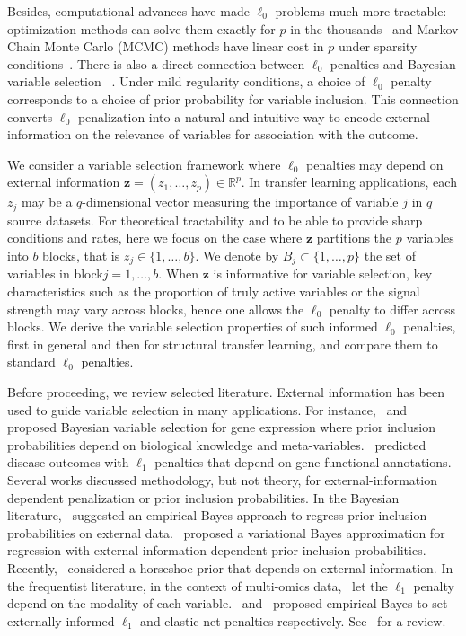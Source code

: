 \documentclass[
  12pt]{article}
\newcommand{\R}{\mathbb{R}}
\newcommand{\bz}{\boldsymbol{z}}
\begin{document}
Besides, computational advances have made $\ell_0$ problems much more tractable: optimization methods can solve them exactly for $p$ in the thousands~\citep{bertsimas2020sparse} and Markov Chain Monte Carlo (MCMC) methods have linear cost in $p$ under sparsity conditions~\citep{Yang2016,zhou2022}. There is also a direct connection between $\ell_0$ penalties and Bayesian variable selection ~\citep{BIC,EBIC,rossell2022concentration}. Under mild regularity conditions, a choice of $\ell_0$ penalty corresponds to a choice of prior probability for variable inclusion. This connection converts $\ell_0$ penalization into a natural and intuitive way to encode external information on the relevance of variables for association with the outcome. 

We consider a variable selection framework where $\ell_0$ penalties may depend on external information $\bz=(z_1,\ldots,z_p) \in \R^p$. In transfer learning applications, each $z_j$ may be a $q$-dimensional vector measuring the importance of variable $j$ in $q$ source datasets. For theoretical tractability and to be able to provide sharp conditions and rates, here we focus on the case where $\bz$ partitions the $p$ variables into $b$ blocks, that is $z_j \in \{1,\ldots,b\}$.
We denote by $B_j \subset \{1,\ldots,p\}$ the set of variables in block$j=1,\ldots,b$.
When $\bz$ is informative for variable selection, key characteristics such as the proportion of truly active variables or the signal strength may vary across blocks, hence one allows the $\ell_0$ penalty to differ across blocks. 
We derive the variable selection properties of such informed $\ell_0$ penalties, first in general and then for structural transfer learning, and compare them to standard $\ell_0$ penalties.

Before proceeding, we review selected literature.
External information has been used to guide variable selection in many applications. For instance,~\cite{stingo:2011} and~\cite{cassese:2014} proposed Bayesian variable selection for gene expression where prior inclusion probabilities depend on biological knowledge and meta-variables.~\cite{chen_tinghuei:2021} predicted disease outcomes with $\ell_1$ penalties that depend on gene functional annotations. Several works discussed methodology, but not theory, for external-information dependent penalization or prior inclusion probabilities. In the Bayesian literature,~\cite{vandeWiel2019} suggested an empirical Bayes approach to regress prior inclusion probabilities on external data.~\cite{Velten2021} proposed a variational Bayes approximation for regression with external information-dependent prior inclusion probabilities. Recently,~\cite{busatto2023} considered a horseshoe prior that depends on external information. In the frequentist literature, in the context of multi-omics data,~\cite{Boulesteix2017} let the $\ell_1$ penalty depend on the modality of each variable.~\cite{Zeng2020} and~\cite{vanNee2023} proposed empirical Bayes to set externally-informed $\ell_1$ and elastic-net penalties respectively. See~\cite{vandewiel2024} for a review.
\end{document}
